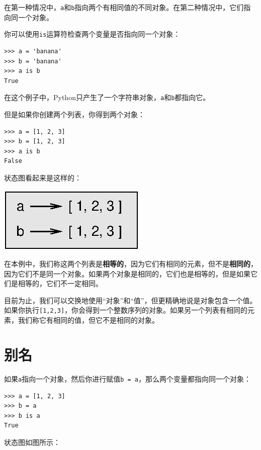 在第一种情况中，{\tt a}和{\tt b}指向两个有相同值的不同对象。在第二种情况中，它们指向同一个对象。


你可以使用{\tt is}运算符检查两个变量是否指向同一个对象：

\beforeverb
\begin{verbatim}
>>> a = 'banana'
>>> b = 'banana'
>>> a is b
True
\end{verbatim}
\afterverb
%
在这个例子中，Python只产生了一个字符串对象，{\tt a}和{\tt b}都指向它。

但是如果你创建两个列表，你得到两个对象：

\beforeverb
\begin{verbatim}
>>> a = [1, 2, 3]
>>> b = [1, 2, 3]
>>> a is b
False
\end{verbatim}
\afterverb
%
状态图看起来是这样的：


\beforefig
\centerline{\includegraphics{figs/list2.eps}}
\afterfig

在本例中，我们称这两个列表是{\bf 相等的}，因为它们有相同的元素，但不是{\bf 相同的}，因为它们不是同一个对象。如果两个对象是相同的，它们也是相等的，但是如果它们是相等的，它们不一定相同。


目前为止，我们可以交换地使用“对象”和“值”，但更精确地说是对象包含一个值。如果你执行{\tt [1,2,3]}，你会得到一个整数序列的对象。如果另一个列表有相同的元素，我们称它有相同的值，但它不是相同的对象。



\section{别名}


如果{\tt a}指向一个对象，然后你进行赋值{\tt b = a}，那么两个变量都指向同一个对象：

\beforeverb
\begin{verbatim}
>>> a = [1, 2, 3]
>>> b = a
>>> b is a
True
\end{verbatim}
\afterverb
%
状态图如图所示：

